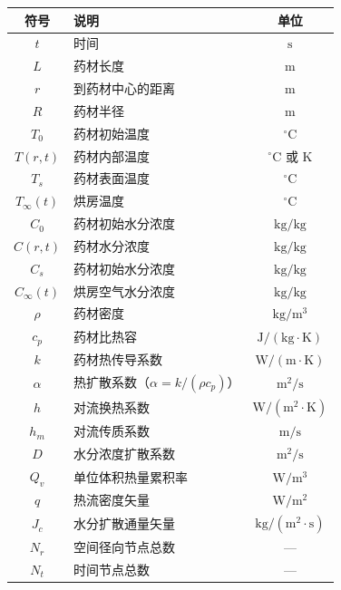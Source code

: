 \documentclass[withoutpreface,bwprint]{cumcm_thesis}
\begin{document}
\begin{table}[H]
\centering
\begin{tabularx}{\textwidth}{CLC}
\toprule
符号 & 说明 & 单位 \\
\midrule
\(t\)      & 时间                                   & \(\mathrm{s}\)  \\
\(L\)      & 药材长度                               & \(\mathrm{m}\) \\
\(r\)      & 到药材中心的距离                       & \(\mathrm{m}\) \\
\(R\)      & 药材半径                               & \(\mathrm{m}\) \\
\(T_0\)    & 药材初始温度                           & \(^{\circ}\mathrm{C}\) \\
\(T(r,t)\) & 药材内部温度                           & \(^{\circ}\mathrm{C}\) 或 \(\mathrm{K}\) \\
\(T_s\)    & 药材表面温度                           & \(^{\circ}\mathrm{C}\) \\
\(T_\infty(t)\) & 烘房温度                     & \(^{\circ}\mathrm{C}\) \\
\(C_0\)    & 药材初始水分浓度                       & \(\mathrm{kg/kg}\) \\
\(C(r,t)\) & 药材水分浓度             & \(\mathrm{kg/kg}\) \\
\(C_s\)    & 药材初始水分浓度                       & \(\mathrm{kg/kg}\) \\
\(C_\infty(t)\) & 烘房空气水分浓度             & \(\mathrm{kg/kg}\) \\
\(\rho\)   & 药材密度                               & \(\mathrm{kg/m^3}\) \\
\(c_p\)    & 药材比热容                             & \(\mathrm{J/(kg\cdot K)}\) \\
\(k\)      & 药材热传导系数                         & \(\mathrm{W/(m\cdot K)}\) \\
\(\alpha\) & 热扩散系数（\(\alpha = k/(\rho c_p)\)） & \(\mathrm{m^2/s}\) \\
\(h\)      & 对流换热系数                           & \(\mathrm{W/(m^2\cdot K)}\) \\
\(h_m\)    & 对流传质系数                           & \(\mathrm{m/s}\) \\
\(D\)      & 水分浓度扩散系数                       & \(\mathrm{m^2/s}\) \\
\(Q_v\)    & 单位体积热量累积率                     & \(\mathrm{W/m^3}\) \\
\(q\)      & 热流密度矢量                           & \(\mathrm{W/m^2}\) \\
\(J_c\)    & 水分扩散通量矢量                       & \(\mathrm{kg/(m^2\cdot s)}\) \\
\(N_r\)    & 空间径向节点总数                       & --- \\
\(N_t\)    & 时间节点总数                           & --- \\

\bottomrule
\end{tabularx}
\label{tab:符号说明}
\end{table}
\end{document}
